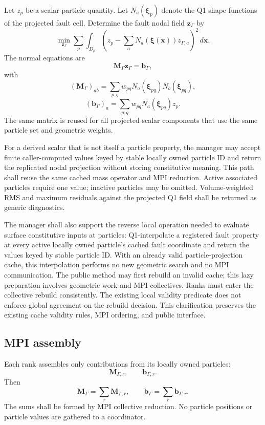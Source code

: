 \documentclass[11pt]{article}
\begin{document}
Let $z_p$ be a scalar particle quantity.  Let $N_a(\boldsymbol\xi_p)$ denote the Q1 shape functions of the projected fault cell.  Determine the fault nodal field $\mathbf{z}_\Gamma$ by
\[
\boxed{
\min_{\mathbf{z}_\Gamma}
\sum_p\int_{D_p}
\left(
 z_p-\sum_aN_a(\boldsymbol\xi(\boldsymbol x))z_{\Gamma,a}
\right)^2\,d\boldsymbol x.
}
\]
The normal equations are
\[
\boxed{
\mathbf{M}_\Gamma\mathbf{z}_\Gamma=\mathbf{b}_\Gamma,
}
\]
with
\[
(\mathbf{M}_\Gamma)_{ab}
=
\sum_{p,q} w_{pq}N_a(\boldsymbol\xi_{pq})N_b(\boldsymbol\xi_{pq}),
\]
\[
(\mathbf{b}_\Gamma)_a
=
\sum_{p,q} w_{pq}N_a(\boldsymbol\xi_{pq})z_p.
\]
The same matrix is reused for all projected scalar components that use the same particle set and geometric weights.

For a derived scalar that is not itself a particle property, the manager may
accept finite caller-computed values keyed by stable locally owned particle ID
and return the replicated nodal projection without storing constitutive
meaning. This path shall reuse the same cached mass operator and MPI reduction.
Active associated particles require one value; inactive particles may be
omitted. Volume-weighted RMS and maximum residuals against the projected Q1
field shall be returned as generic diagnostics.

The manager shall also support the reverse local operation needed to evaluate
surface constitutive inputs at particles: Q1-interpolate a registered fault
property at every active locally owned particle's cached fault coordinate and
return the values keyed by stable particle ID. With an already valid
particle-projection cache, this interpolation performs no new geometric search
and no MPI communication. The public method may first rebuild an invalid cache;
this lazy preparation involves geometric work and MPI collectives. Ranks must
enter the collective rebuild consistently. The existing local validity
predicate does not enforce global agreement on the rebuild decision. This
clarification preserves the existing cache validity rules, MPI ordering, and
public interface.

\subsection{MPI assembly}
Each rank assembles only contributions from its locally owned particles:
\[
\mathbf{M}_{\Gamma,r},\qquad
\mathbf{b}_{\Gamma,r}.
\]
Then
\[
\boxed{
\mathbf{M}_\Gamma=\sum_r\mathbf{M}_{\Gamma,r},
\qquad
\mathbf{b}_\Gamma=\sum_r\mathbf{b}_{\Gamma,r}.
}
\]
The sums shall be formed by MPI collective reduction.  No particle positions or particle values are gathered to a coordinator.
\end{document}
